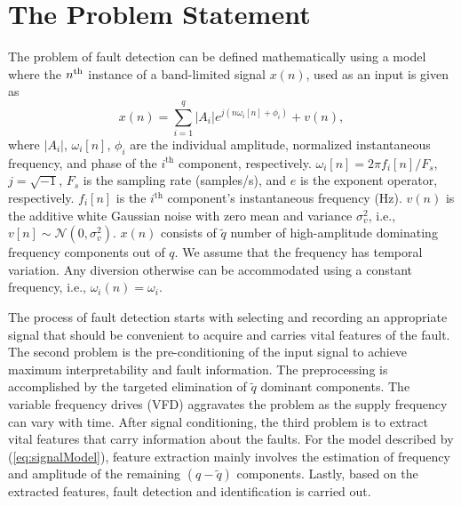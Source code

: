 \section{The Problem Statement}
The problem of fault detection can be defined mathematically using a model where the $n^{\rm{th}}$ instance of a band-limited signal $x(n)$,  used as an input is given as 
\begin{equation}
	x(n) = \sum\limits_{i = 1}^{q} {\left| {{A_i}} \right|{e^{j(n{\omega _i[n]} + {\phi _i})}}}  + v(n),
	\label{eq:signalModel}
\end{equation}
where ${\left| {{A_i}} \right|}$, ${\omega _i[n]}$, $\phi_i$ are the individual amplitude, normalized instantaneous frequency, and phase of the $i^{\mathrm{th}}$ component, respectively. ${\omega _i[n]} = 2\pi {f_i[n]}/F_s$, $j = \sqrt { - 1}$, $F_s$ is the sampling rate (samples/s), and $e$ is the exponent operator, respectively. ${f_i[n]}$ is the $i^{\mathrm{th}}$ component's instantaneous frequency (Hz). $v(n)$ is the additive white Gaussian noise with zero mean and variance $\sigma_v ^2$, i.e., $v[n] \sim \mathcal N(0,\sigma _v^2)$. $x(n)$ consists of ${\tilde q}$ number of high-amplitude  dominating frequency components out of $q.$ We assume that the frequency has temporal variation. Any diversion otherwise can be accommodated using a constant frequency, i.e., $\omega_i (n) = \omega_i.$ 

The process of fault detection starts with selecting and recording an appropriate signal that should be convenient to acquire and carries vital features of the fault. The second problem is the pre-conditioning of the input signal to achieve maximum interpretability and fault information. The preprocessing is accomplished by the targeted elimination of ${\tilde q}$ dominant components. The variable frequency drives (VFD) aggravates the problem as the supply frequency can vary with time. After signal conditioning, the third problem is to extract vital features that carry information about the faults. For the model described by (\ref{eq:signalModel}), feature extraction mainly involves the estimation of frequency and amplitude of the remaining $(q-\tilde q)$ components. Lastly, based on the extracted features, fault detection and identification is carried out.